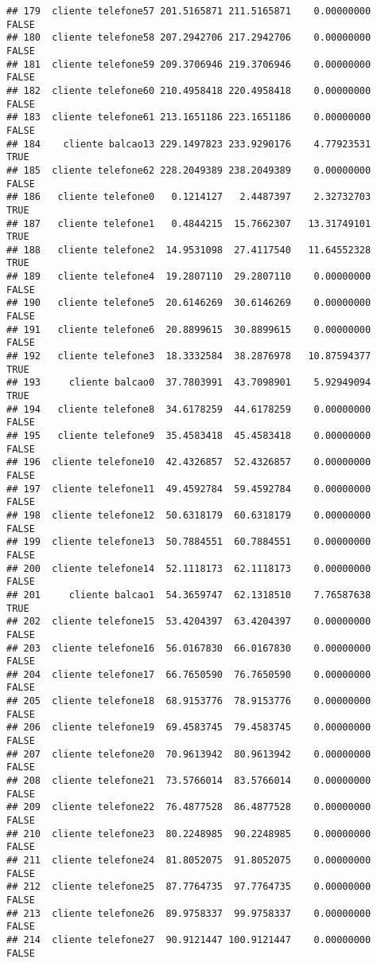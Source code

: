 \documentclass[
]{article}
\begin{document}
\begin{verbatim}
## 179  cliente telefone57 201.5165871 211.5165871    0.00000000    FALSE
## 180  cliente telefone58 207.2942706 217.2942706    0.00000000    FALSE
## 181  cliente telefone59 209.3706946 219.3706946    0.00000000    FALSE
## 182  cliente telefone60 210.4958418 220.4958418    0.00000000    FALSE
## 183  cliente telefone61 213.1651186 223.1651186    0.00000000    FALSE
## 184    cliente balcao13 229.1497823 233.9290176    4.77923531     TRUE
## 185  cliente telefone62 228.2049389 238.2049389    0.00000000    FALSE
## 186   cliente telefone0   0.1214127   2.4487397    2.32732703     TRUE
## 187   cliente telefone1   0.4844215  15.7662307   13.31749101     TRUE
## 188   cliente telefone2  14.9531098  27.4117540   11.64552328     TRUE
## 189   cliente telefone4  19.2807110  29.2807110    0.00000000    FALSE
## 190   cliente telefone5  20.6146269  30.6146269    0.00000000    FALSE
## 191   cliente telefone6  20.8899615  30.8899615    0.00000000    FALSE
## 192   cliente telefone3  18.3332584  38.2876978   10.87594377     TRUE
## 193     cliente balcao0  37.7803991  43.7098901    5.92949094     TRUE
## 194   cliente telefone8  34.6178259  44.6178259    0.00000000    FALSE
## 195   cliente telefone9  35.4583418  45.4583418    0.00000000    FALSE
## 196  cliente telefone10  42.4326857  52.4326857    0.00000000    FALSE
## 197  cliente telefone11  49.4592784  59.4592784    0.00000000    FALSE
## 198  cliente telefone12  50.6318179  60.6318179    0.00000000    FALSE
## 199  cliente telefone13  50.7884551  60.7884551    0.00000000    FALSE
## 200  cliente telefone14  52.1118173  62.1118173    0.00000000    FALSE
## 201     cliente balcao1  54.3659747  62.1318510    7.76587638     TRUE
## 202  cliente telefone15  53.4204397  63.4204397    0.00000000    FALSE
## 203  cliente telefone16  56.0167830  66.0167830    0.00000000    FALSE
## 204  cliente telefone17  66.7650590  76.7650590    0.00000000    FALSE
## 205  cliente telefone18  68.9153776  78.9153776    0.00000000    FALSE
## 206  cliente telefone19  69.4583745  79.4583745    0.00000000    FALSE
## 207  cliente telefone20  70.9613942  80.9613942    0.00000000    FALSE
## 208  cliente telefone21  73.5766014  83.5766014    0.00000000    FALSE
## 209  cliente telefone22  76.4877528  86.4877528    0.00000000    FALSE
## 210  cliente telefone23  80.2248985  90.2248985    0.00000000    FALSE
## 211  cliente telefone24  81.8052075  91.8052075    0.00000000    FALSE
## 212  cliente telefone25  87.7764735  97.7764735    0.00000000    FALSE
## 213  cliente telefone26  89.9758337  99.9758337    0.00000000    FALSE
## 214  cliente telefone27  90.9121447 100.9121447    0.00000000    FALSE

\end{verbatim}
\end{document}
